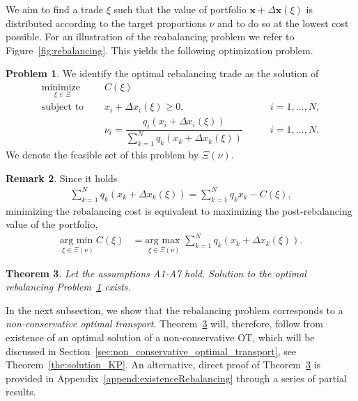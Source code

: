 \documentclass{article}
\newtheorem{theorem}{Theorem}[section]
\theoremstyle{definition}
\newtheorem{remark}[theorem]{Remark}
\newtheorem{problem}[theorem]{Problem}
\def\bx{\mathbf{x}}
\begin{document}
We aim to find a trade $\xi$ such that the value of portfolio $\bx + \Delta \bx (\xi)$ is distributed according to the target proportions $\nu$ and to do so at the lowest cost possible. For an illustration of the reabalancing problem we refer to Figure~\ref{fig:rebalancing}. This yields the following optimization problem.

\begin{problem}\label{prob:rebalance}
We identify the optimal rebalancing trade as the solution of 
\begin{align*}
\underset{\xi \in \Xi}{\text{minimize }} \quad  &C(\xi) & \\
\text{subject to } \quad &x_i + \Delta x_i (\xi) \geq 0, \quad \quad &i = 1, \dots, N,  \\
&\nu_i = \dfrac{q_i \left( x_i + \Delta x_i (\xi) \right)}{\sum\limits_{k=1}^N q_k \left( x_k + \Delta x_k (\xi) \right)} \quad \quad &i = 1, \dots, N. 
\end{align*}
We denote the feasible set of this problem by $\Xi(\nu)$.
\end{problem}

\begin{remark}
Since it holds
\begin{align*}
\sum\limits_{k=1}^N q_k \left( x_k + \Delta x_k (\xi) \right) = \sum\limits_{k=1}^N q_k  x_k - C(\xi), 
\end{align*}
minimizing the rebalancing cost is equivalent to maximizing the post-rebalancing value of the portfolio,
\begin{align*}
\underset{\xi \in \Xi(\nu)}{\text{arg min }} C(\xi) &= \underset{\xi \in \Xi(\nu)}{\text{arg max }} \sum\limits_{k=1}^N q_k \left( x_k + \Delta x_k (\xi) \right). 
\end{align*}
\end{remark}

\begin{theorem}\label{thm:OptRebalancing}
Let the assumptions A1-A7 hold. Solution to the optimal rebalancing Problem~\ref{prob:rebalance} exists.    
\end{theorem}
In the next subsection, we show that the rebalancing problem corresponds to a \emph{non-conservative optimal transport}. Theorem~\ref{thm:OptRebalancing} will, therefore, follow from existence of an optimal solution of a non-conservative OT, which will be discussed in Section~\ref{sec:non_conservative_optimal_transport}, see Theorem~\ref{the:solution_KP}. An alternative, direct proof of Theorem~\ref{thm:OptRebalancing} is provided in Appendix~\ref{append:existenceRebalancing} through a series of partial results.
\end{document}
